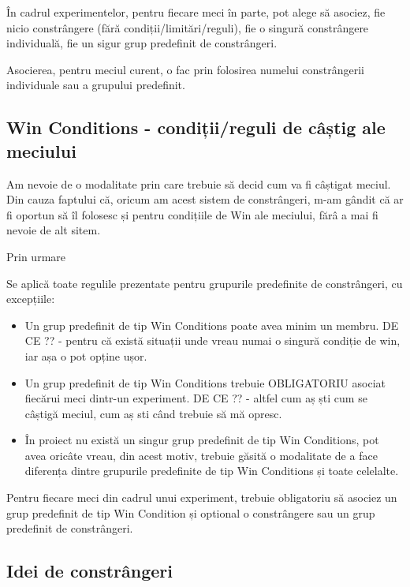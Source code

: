 \documentclass{article}
\begin{document}
În cadrul experimentelor, pentru fiecare meci în parte, pot alege să asociez, fie nicio constrângere (fără condiții/limitări/reguli), fie o singură constrângere individuală, fie un sigur grup predefinit de constrângeri.

Asocierea, pentru meciul curent, o fac prin folosirea numelui constrângerii individuale sau a grupului predefinit.

\subsection{Win Conditions - condiții/reguli de câștig ale meciului}
Am nevoie de o modalitate prin care trebuie să decid cum va fi câștigat meciul. Din cauza faptului că, oricum am acest sistem de constrângeri, m-am gândit că ar fi oportun să îl folosesc și pentru condițiile de Win ale meciului, fărâ a mai fi nevoie de alt sitem.

Prin urmare \textbf{ \color{red}{Win Conditions (condițiile, regulile de câștig ale meciului) - reprezintă un grup predefinit de constrângeri care indică ceea ce trebuie făcut pentru câștigarea meciului.} }

Se aplică toate regulile prezentate pentru grupurile predefinite de constrângeri, cu excepțiile:
\begin{itemize}
    \item Un grup predefinit de tip Win Conditions poate avea minim un membru. DE CE ?? - pentru că există situații unde vreau numai o singură condiție de win, iar așa o pot opține ușor.
    \item Un grup predefinit de tip Win Conditions trebuie OBLIGATORIU asociat fiecărui meci dintr-un experiment. DE CE ?? - altfel cum aș ști cum se câștigă meciul, cum aș sti când trebuie să mă opresc.
    \item În proiect nu există un singur grup predefinit de tip Win Conditions, pot avea oricâte vreau, din acest motiv, trebuie găsită o modalitate de a face diferența dintre grupurile predefinite de tip Win Conditions și toate celelalte.
\end{itemize}

Pentru fiecare meci din cadrul unui experiment, trebuie obligatoriu să asociez un grup predefinit de tip Win Condition și optional o constrângere sau un grup predefinit de constrângeri.

\subsection{Idei de constrângeri}
\end{document}
